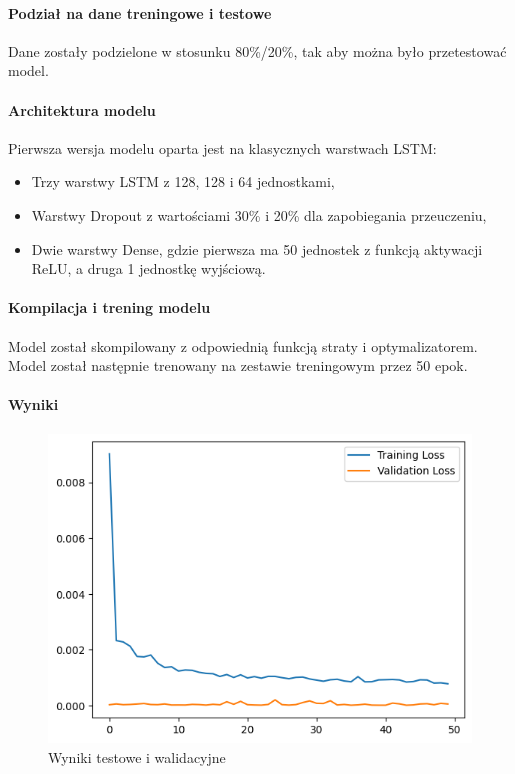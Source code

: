 \paragraph{Podział na dane treningowe i testowe}
Dane zostały podzielone w stosunku 80\%/20\%, tak aby można było przetestować model.

\paragraph{Architektura modelu}

Pierwsza wersja modelu oparta jest na klasycznych warstwach LSTM:
\begin{itemize}
    \item Trzy warstwy LSTM z 128, 128 i 64 jednostkami,
    \item Warstwy Dropout z wartościami 30\% i 20\% dla zapobiegania przeuczeniu,
    \item Dwie warstwy Dense, gdzie pierwsza ma 50 jednostek z funkcją aktywacji ReLU, a druga 1 jednostkę wyjściową.
\end{itemize}

\paragraph{Kompilacja i trening modelu}
Model został skompilowany z odpowiednią funkcją straty i optymalizatorem. Model został następnie trenowany na zestawie treningowym przez 50 epok.

\paragraph{Wyniki}

\begin{figure}[htb]
    \centering
    \includegraphics[width=0.8\linewidth]{Wyniki_testowe_i_walidacyjne.png}
    \caption{Wyniki testowe i walidacyjne}
    \label{fig:Wyniki_testowe_i_walidacyjne}
\end{figure}


